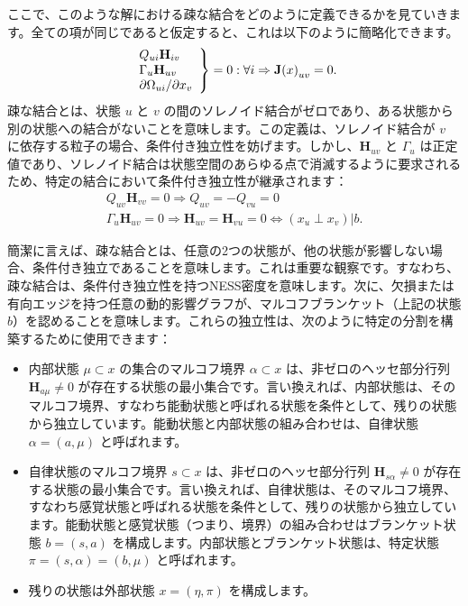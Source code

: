 \documentclass[a4paper, titlepage]{jsarticle}
\begin{document}
ここで、このような解における疎な結合をどのように定義できるかを見ていきます。全ての項が同じであると仮定すると、これは以下のように簡略化できます。
\begin{equation}\label{sparse_coupling}
    \left.
    \begin{array}{l}
        Q_{ui}\mathbf{H}_{iv} \\
        \Gamma_{u}\mathbf{H}_{uv} \\
        \partial\Omega_{ui}/\partial x_v
    \end{array}
    \right\}
    =0:\forall i\Rightarrow\mathbf{J}\qty(x)_{uv}=0.
\end{equation}
疎な結合とは、状態 $u$ と $v$ の間のソレノイド結合がゼロであり、ある状態から別の状態への結合がないことを意味します。この定義は、ソレノイド結合が $v$ に依存する粒子の場合、条件付き独立性を妨げます。しかし、$\mathbf{H}_{uv}$ と $\Gamma_{u}$ は正定値であり、ソレノイド結合は状態空間のあらゆる点で消滅するように要求されるため、特定の結合において条件付き独立性が継承されます：
\begin{equation}
    \begin{aligned}
        Q_{uv}\mathbf{H}_{vv} = 0 \Rightarrow Q_{uv} = -Q_{vu}=0 \\
        \Gamma_{u}\mathbf{H}_{uv} = 0 \Rightarrow \mathbf{H}_{uv}=\mathbf{H}_{vu} = 0 \Leftrightarrow (x_u \perp x_v)|b.
    \end{aligned}
\end{equation}
\par
簡潔に言えば、疎な結合とは、任意の2つの状態が、他の状態が影響しない場合、条件付き独立であることを意味します。これは重要な観察です。すなわち、疎な結合は、条件付き独立性を持つNESS密度を意味します。次に、欠損または有向エッジを持つ任意の動的影響グラフが、マルコフブランケット（上記の状態 $b$）を認めることを意味します。これらの独立性は、次のように特定の分割を構築するために使用できます：
\begin{itemize}
    \item 内部状態 $\mu \subset x$ の集合のマルコフ境界 $\alpha \subset x$ は、非ゼロのヘッセ部分行列 $\mathbf{H}_{a\mu} \neq 0$ が存在する状態の最小集合です。言い換えれば、内部状態は、そのマルコフ境界、すなわち能動状態と呼ばれる状態を条件として、残りの状態から独立しています。能動状態と内部状態の組み合わせは、自律状態 $\alpha = (a, \mu)$ と呼ばれます。
    \item 自律状態のマルコフ境界 $s \subset x$ は、非ゼロのヘッセ部分行列 $\mathbf{H}_{s\alpha} \neq 0$ が存在する状態の最小集合です。言い換えれば、自律状態は、そのマルコフ境界、すなわち感覚状態と呼ばれる状態を条件として、残りの状態から独立しています。能動状態と感覚状態（つまり、境界）の組み合わせはブランケット状態 $b = (s, a)$ を構成します。内部状態とブランケット状態は、特定状態 $\pi = (s, \alpha) = (b, \mu)$ と呼ばれます。
    \item 残りの状態は外部状態 $x = (\eta, \pi)$ を構成します。
\end{itemize}
\end{document}
